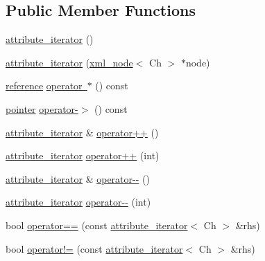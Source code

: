 \subsection*{Public Member Functions}
\begin{DoxyCompactItemize}
\item 
\mbox{\hyperlink{classrapidxml_1_1attribute__iterator_a30a82132793bc59d4e7b20f5be6237b9}{attribute\+\_\+iterator}} ()
\item 
\mbox{\hyperlink{classrapidxml_1_1attribute__iterator_a1109344dead88533ae4dd68cea5d9613}{attribute\+\_\+iterator}} (\mbox{\hyperlink{classrapidxml_1_1xml__node}{xml\+\_\+node}}$<$ Ch $>$ $\ast$node)
\item 
\mbox{\hyperlink{classrapidxml_1_1attribute__iterator_a097343e44557de14de86b470d3f917d9}{reference}} \mbox{\hyperlink{classrapidxml_1_1attribute__iterator_af26af25174fee4503d3854162ef125b9}{operator $\ast$}} () const
\item 
\mbox{\hyperlink{classrapidxml_1_1attribute__iterator_a69acc2e60270d6a062c03c9cb1cf2aa7}{pointer}} \mbox{\hyperlink{classrapidxml_1_1attribute__iterator_a499c7ed0e1835f029585d0a9ba25f446}{operator-\/$>$}} () const
\item 
\mbox{\hyperlink{classrapidxml_1_1attribute__iterator}{attribute\+\_\+iterator}} \& \mbox{\hyperlink{classrapidxml_1_1attribute__iterator_afe7d15a4a1b228f97f1d4ebd4f3f6cca}{operator++}} ()
\item 
\mbox{\hyperlink{classrapidxml_1_1attribute__iterator}{attribute\+\_\+iterator}} \mbox{\hyperlink{classrapidxml_1_1attribute__iterator_a82c8859b9eebd45caa3afc25b9e78c36}{operator++}} (int)
\item 
\mbox{\hyperlink{classrapidxml_1_1attribute__iterator}{attribute\+\_\+iterator}} \& \mbox{\hyperlink{classrapidxml_1_1attribute__iterator_af22f1ad3c11d3269b43b49e29b89d7d1}{operator-\/-\/}} ()
\item 
\mbox{\hyperlink{classrapidxml_1_1attribute__iterator}{attribute\+\_\+iterator}} \mbox{\hyperlink{classrapidxml_1_1attribute__iterator_af52a8562ab1b2c0391cdde79f55e4a6f}{operator-\/-\/}} (int)
\item 
bool \mbox{\hyperlink{classrapidxml_1_1attribute__iterator_ab1dc8dd11d21e145a4e3f76d46aead0d}{operator==}} (const \mbox{\hyperlink{classrapidxml_1_1attribute__iterator}{attribute\+\_\+iterator}}$<$ Ch $>$ \&rhs)
\item 
bool \mbox{\hyperlink{classrapidxml_1_1attribute__iterator_a39e8cf336c324521fd9c720abf280d88}{operator!=}} (const \mbox{\hyperlink{classrapidxml_1_1attribute__iterator}{attribute\+\_\+iterator}}$<$ Ch $>$ \&rhs)
\end{DoxyCompactItemize}
